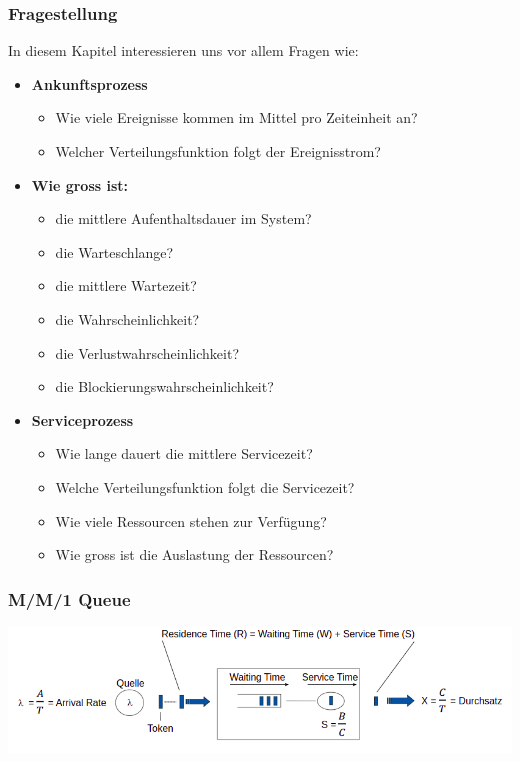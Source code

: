\subsubsection{Fragestellung}
In diesem Kapitel interessieren uns vor allem Fragen wie:
\begin{itemize}
    \item \textbf{Ankunftsprozess}
    \begin{itemize}
        \item Wie viele Ereignisse kommen im Mittel pro Zeiteinheit an?
        \item Welcher Verteilungsfunktion folgt der Ereignisstrom?
    \end{itemize}
    \item \textbf{Wie gross ist:}
    \begin{itemize}
        \item die mittlere Aufenthaltsdauer im System?
        \item die Warteschlange?
        \item die mittlere Wartezeit?
        \item die Wahrscheinlichkeit?
        \item die Verlustwahrscheinlichkeit?
        \item die Blockierungswahrscheinlichkeit?
    \end{itemize}
        \item \textbf{Serviceprozess}
    \begin{itemize}
        \item Wie lange dauert die mittlere Servicezeit?
        \item Welche Verteilungsfunktion folgt die Servicezeit?
        \item Wie viele Ressourcen stehen zur Verfügung?
        \item Wie gross ist die Auslastung der Ressourcen?
    \end{itemize}
\end{itemize}

\subsubsection{M/M/1 Queue}

\begin{minipage}[t]{0.9\textwidth}
\centering
\includegraphics[width=0.9\linewidth]{images/m_m_1-queue.png}
\end{minipage}

